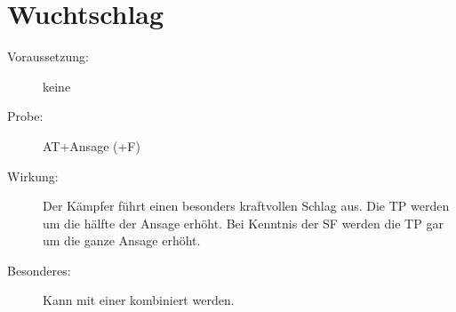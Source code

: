 \section{Wuchtschlag}
\label{bAT.wuchtschlag}
\begin{description}
    \item[Voraussetzung:]
        keine
    \item[Probe:]
        AT+Ansage (+F)
    \item[Wirkung:]
        Der Kämpfer führt einen besonders kraftvollen Schlag aus.
        Die TP werden um die hälfte der Ansage erhöht.
        Bei Kenntnis der SF  werden die TP gar um die ganze Ansage erhöht.
    \item[Besonderes:]
        Kann mit einer  kombiniert werden.
\end{description}
